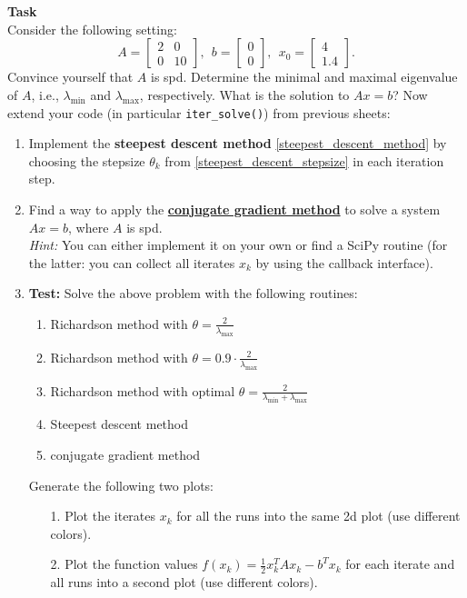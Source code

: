 ~\\~\\
\textbf{Task}\\
Consider the following setting: 
	$$A = 			\begin{bmatrix}
	2&0\\
	0&10
	\end{bmatrix}, ~~b = 			\begin{bmatrix}
	0\\
	0
	\end{bmatrix}, ~~x_0 = \begin{bmatrix}
	4\\
	1.4
	\end{bmatrix}.$$
Convince yourself that $A$ is spd. Determine the minimal and maximal eigenvalue of $A$, i.e., $\lambda_{\text{min}}$ and $\lambda_{\text{max}}$, respectively. What is the solution to $Ax=b$? Now extend your code (in particular \verb|iter_solve()|) from previous sheets:
	\begin{enumerate}
		\item Implement the \textbf{steepest descent method} \eqref{steepest_descent_method} by choosing the stepsize $\theta_k$ from \eqref{steepest_descent_stepsize} in each iteration step.
		\item Find a way to apply the \href{https://en.wikipedia.org/wiki/Conjugate_gradient_method#Example_code_in_MATLAB_/_GNU_Octave}{\textbf{conjugate gradient method}} to solve a system $Ax=b$, where $A$ is spd.\\
		\textit{Hint:} You can either implement it on your own  or find a SciPy routine (for the latter: you can collect all iterates $x_k$ by using the callback interface).
		\item \textbf{Test:} Solve the above problem with the following routines:
		\begin{enumerate}
			\item Richardson method with $\theta = \frac{2}{\lambda_{\text{max}}}$
			\item Richardson method with $\theta = 0.9 \cdot \frac{2}{\lambda_{\text{max}}}$
			\item Richardson method with optimal $\theta = \frac{2}{\lambda_{\text{min}}+\lambda_{\text{max}}}$
			\item Steepest descent method
			\item conjugate gradient method
		\end{enumerate}
		Generate the following two plots:
		\begin{itemize}
			\item[1.] Plot the iterates $x_k$ for all the runs into the same 2d plot (use different colors).
			\item[2.] Plot the function values $f(x_k) = \frac{1}{2} x_k^TAx_k - b^Tx_k$ for each iterate and all runs into a second plot (use different colors).
		\end{itemize}
	\end{enumerate}
